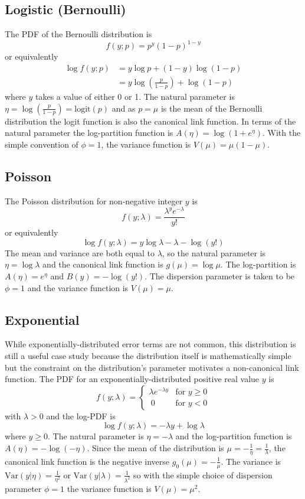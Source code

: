 \documentclass{article}
\begin{document}
\subsection{Logistic (Bernoulli)}

The PDF of the Bernoulli distribution is
\[ f(y; p) = p^y (1-p)^{1-y} \]
or equivalently
\begin{align}
\log f(y; p) &= y \log p + (1-y) \log(1-p) \\\
&= y \log\left(\frac{p}{1-p}\right) + \log(1-p)
\end{align}
where \(y\) takes a value of either 0 or 1.
The natural parameter is \(\eta = \log\left(\frac{p}{1-p}\right) =
\textrm{logit}(p) \) and as \(p = \mu\) is the mean of the Bernoulli
distribution the logit function is also the canonical link function.
In terms of the natural parameter the log-partition function is \(A(\eta) =
\log\left(1 + e^\eta \right)\).
With the simple convention of \(\phi=1\), the variance function is \(V(\mu) =
\mu(1-\mu)\).


\subsection{Poisson}

The Poisson distribution for non-negative integer \(y\) is
\[ f(y; \lambda) = \frac{\lambda^y e^{-\lambda}}{y!} \]
or equivalently
\[ \log f(y; \lambda) = y \log \lambda - \lambda - \log(y!) \]
The mean and variance are both equal to \(\lambda\), so the natural parameter
is \(\eta = \log \lambda\) and the canonical link function is \(g(\mu) = \log
\mu \).
The log-partition is \(A(\eta) = e^\eta \) and \(B(y) = -\log(y!)\).
The dispersion parameter is taken to be \(\phi = 1\) and the variance function
is \(V(\mu) = \mu\).


\subsection{Exponential}

While exponentially-distributed error terms are not common, this distribution is
still a useful case study because the distribution itself is mathematically
simple but the constraint on the distribution's parameter motivates a
non-canonical link function.
The PDF for an exponentially-distributed positive real value \(y\) is
\[ f(y; \lambda) = \begin{cases}
\lambda e^{-\lambda y} & \textrm{for } y \geq 0 \\\
0 & \textrm{for } y < 0
\end{cases}\]
with \(\lambda > 0\) and the log-PDF is
\[ \log f(y; \lambda) = -\lambda y + \log \lambda \]
where \(y \geq 0\). The natural parameter is \(\eta = -\lambda\) and the
log-partition function is \(A(\eta) = - \log(-\eta)\).
Since the mean of the distribution is \(\mu = -\frac{1}{\eta} =
\frac{1}{\lambda}\), the canonical link function is the negative inverse
\(g_0(\mu) = -\frac{1}{\mu}\).
The variance is \(\textrm{Var}(y|\eta) = \frac{1}{\eta^2} \) or
\(\textrm{Var}(y|\lambda) = \frac{1}{\lambda^2} \) so with the simple choice
of dispersion parameter \(\phi = 1\) the variance function is \(V(\mu) =
\mu^2\).
\end{document}
